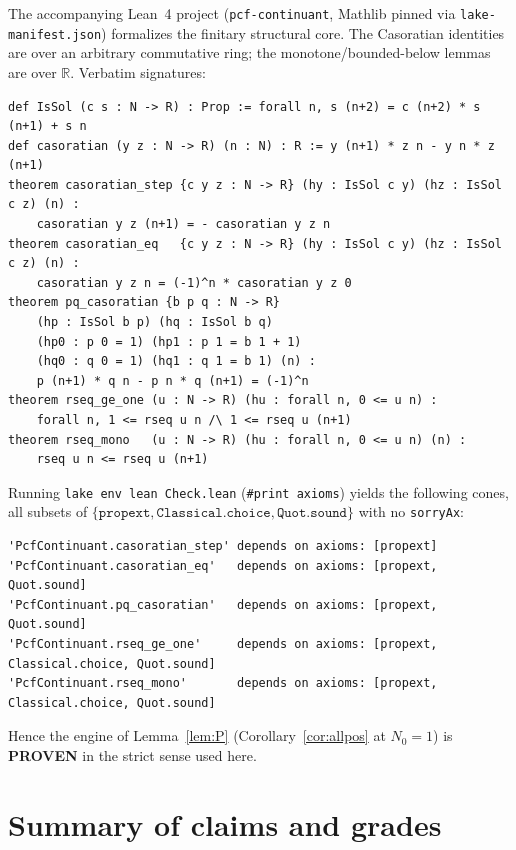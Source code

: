 \documentclass[11pt]{article}
\newcommand{\R}{\mathbb{R}}
\begin{document}
The accompanying Lean~4 project (\texttt{pcf-continuant}, Mathlib pinned via
\texttt{lake-manifest.json}) formalizes the finitary structural core. The Casoratian
identities are over an arbitrary commutative ring; the monotone/bounded-below
lemmas are over $\R$. Verbatim signatures:
{\small
\begin{verbatim}
def IsSol (c s : N -> R) : Prop := forall n, s (n+2) = c (n+2) * s (n+1) + s n
def casoratian (y z : N -> R) (n : N) : R := y (n+1) * z n - y n * z (n+1)
theorem casoratian_step {c y z : N -> R} (hy : IsSol c y) (hz : IsSol c z) (n) :
    casoratian y z (n+1) = - casoratian y z n
theorem casoratian_eq   {c y z : N -> R} (hy : IsSol c y) (hz : IsSol c z) (n) :
    casoratian y z n = (-1)^n * casoratian y z 0
theorem pq_casoratian {b p q : N -> R}
    (hp : IsSol b p) (hq : IsSol b q)
    (hp0 : p 0 = 1) (hp1 : p 1 = b 1 + 1)
    (hq0 : q 0 = 1) (hq1 : q 1 = b 1) (n) :
    p (n+1) * q n - p n * q (n+1) = (-1)^n
theorem rseq_ge_one (u : N -> R) (hu : forall n, 0 <= u n) :
    forall n, 1 <= rseq u n /\ 1 <= rseq u (n+1)
theorem rseq_mono   (u : N -> R) (hu : forall n, 0 <= u n) (n) :
    rseq u n <= rseq u (n+1)
\end{verbatim}
}
Running \texttt{lake env lean Check.lean} (\texttt{\#print axioms}) yields the
following cones, all subsets of
$\{\texttt{propext},\texttt{Classical.choice},\texttt{Quot.sound}\}$ with no
\texttt{sorryAx}:
{\small
\begin{verbatim}
'PcfContinuant.casoratian_step' depends on axioms: [propext]
'PcfContinuant.casoratian_eq'   depends on axioms: [propext, Quot.sound]
'PcfContinuant.pq_casoratian'   depends on axioms: [propext, Quot.sound]
'PcfContinuant.rseq_ge_one'     depends on axioms: [propext, Classical.choice, Quot.sound]
'PcfContinuant.rseq_mono'       depends on axioms: [propext, Classical.choice, Quot.sound]
\end{verbatim}
}
Hence the engine of Lemma~\ref{lem:P} (Corollary~\ref{cor:allpos} at $N_0=1$) is
\textbf{PROVEN} in the strict sense used here.

\section{Summary of claims and grades}\label{sec:summary}
\end{document}
